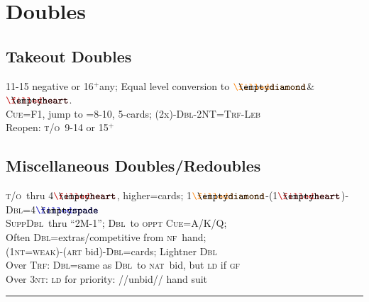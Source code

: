 \documentclass{article}
\newcommand\coloredsuitsymbol[3]{\ensuremath{\mathrel{\raisebox{-0.3pt}{{\color{#1}#2}\llap{#3}}}}}
\newcommand\suitsymbol[3]{\coloredsuitsymbol{#1}{#2}{#3}}%
\newcommand\D{\suitsymbol{diamondcolor}{\filleddiamond}{\emptydiamond}}
\renewcommand\H{\suitsymbol{heartcolor}{\filledheart}{\emptyheart}}
\renewcommand\S{\suitsymbol{spadecolor}{\filledspade}{\emptyspade}}
\newcommand\N{\caps{nt}}
\newcommand\X{\caps{Dbl}}
\newcommand\caps[1]{{\scshape#1}}
\newcommand\GF{\caps{gf}}
\newcommand\NF{\caps{nf}}
\newcommand\TRF{\caps{Trf}}
\newcommand\NAT{\caps{nat}}
\newcommand\takeout{\caps{t/o}}
\newcommand\CUE{\caps{Cue}}
\newcommand\more{\ensuremath{^+}}
\newcommand{\smallsection}[1]{\vspace{-1ex}\subsection*{#1}\raggedright}
\newcommand{\thinrule}{\rule{\textwidth}{\arrayrulewidth}}
\newcommand{\myendrule}{\vspace{-1.5ex}\thinrule}
\begin{document}
\begin{minipage}[t]{90mm}
\section*{Doubles}
\smallsection{Takeout Doubles} 
	11-15 negative or 16\more any; Equal level conversion to \D \& \H.\\
	\CUE=F1, jump to =8-10, 5-cards; (2x)-\X-2NT=\caps{Trf-Leb}\\
	Reopen: \takeout\ 9-14 or 15\more
\smallsection{Miscellaneous Doubles/Redoubles}
	\takeout\ thru 4\H, higher=cards; 1\D-(1\H)-\X=4\S\\
	\caps{Supp}\X\ thru ``2M-1''; \X\ to \caps{oppt} \CUE=A/K/Q;\\ 
	Often \X=extras/competitive from \NF\ hand;\\
	(1\N=\caps{weak})-(\caps{art} bid)-\X=cards;  Lightner \X\\
	Over \TRF: \X=same as \X\ to \NAT\ bid, but \caps{ld} if \GF\\
	Over 3\N: \caps{ld} for  priority: //unbid// hand suit\\
\myendrule
\end{minipage}
\hfill
\end{document}
